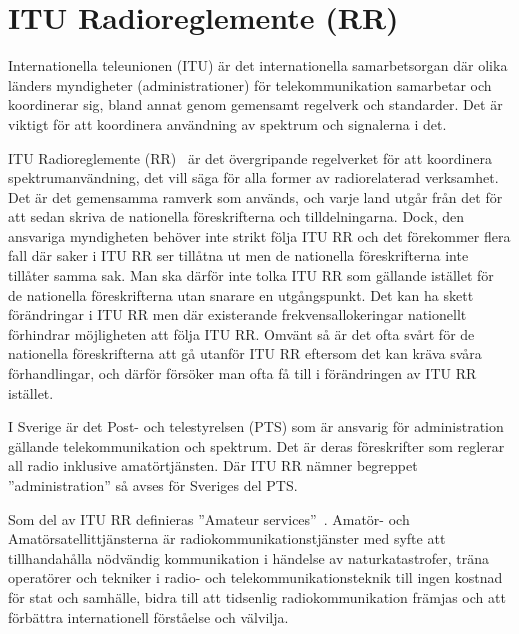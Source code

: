 \section{ITU Radioreglemente (RR)}
\label{ITU radioreglemente}

Internationella teleunionen (ITU) är det internationella samarbetsorgan där
olika länders myndigheter (administrationer) för telekommunikation samarbetar
och koordinerar sig, bland annat genom gemensamt regelverk och standarder.
Det är viktigt för att koordinera användning av spektrum och signalerna i det.

ITU Radioreglemente (RR)~\cite{ITU-RR} är det övergripande regelverket för att
koordinera spektrumanvändning, det vill säga för alla former av
radiorelaterad verksamhet.
Det är det gemensamma ramverk som används, och varje land utgår från det för att
sedan skriva de nationella föreskrifterna och tilldelningarna.
Dock, den ansvariga myndigheten behöver inte strikt följa ITU RR och det
förekommer flera fall där saker i ITU RR ser tillåtna ut men de nationella
föreskrifterna inte tillåter samma sak.
Man ska därför inte tolka ITU RR som gällande istället för de nationella
föreskrifterna utan snarare en utgångspunkt.
Det kan ha skett förändringar i ITU RR men där existerande frekvensallokeringar
nationellt förhindrar möjligheten att följa ITU RR.
Omvänt så är det ofta svårt för de nationella föreskrifterna att gå utanför
ITU RR eftersom det kan kräva svåra förhandlingar, och därför försöker man ofta
få till i förändringen av ITU RR istället.

I Sverige är det Post- och telestyrelsen (PTS) som är ansvarig för
administration gällande telekommunikation och spektrum. Det är deras
föreskrifter som reglerar all radio inklusive amatörtjänsten.
Där ITU RR nämner begreppet ''administration'' så avses för Sveriges del PTS.

Som del av ITU RR definieras ''Amateur services''~\cite[Article 25]{ITU-RR}.
Amatör- och Amatörsatellittjänsterna är radiokommunikationstjänster
med syfte att tillhandahålla nödvändig kommunikation i händelse av
naturkatastrofer, träna operatörer och tekniker i radio- och
telekommunikationsteknik till ingen kostnad för stat och samhälle,
bidra till att tidsenlig radiokommunikation främjas och att förbättra
internationell förståelse och välvilja.

